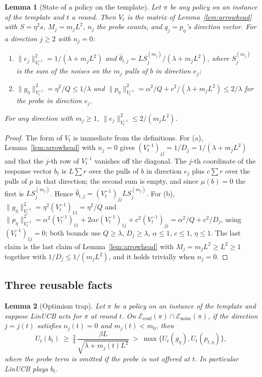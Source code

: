 \documentclass{article}
\newtheorem{lemma}{Lemma}
\theoremstyle{definition}
\theoremstyle{remark}
\theoremstyle{remark}
\begin{document}
\begin{lemma}[State of a policy on the template]
\label{lem:cat-state}
Let $\pi$ be any policy on an instance of the template and $t$ a round. Then
$V_t$ is the matrix of Lemma~\ref{lem:arrowhead} with $S=\eta^2s$, $M_j=m_jL^2$,
$n_j$ the probe counts, and $q_j=p_\eta$'s direction vector. For a direction
$j\ge2$ with $n_j=0$:
\begin{enumerate}[itemsep=1pt,topsep=1pt,leftmargin=*]
\item[(a)] $\|e_j\|^2_{V_t^{-1}}=1/(\lambda+m_jL^2)$ and
$\widehat\theta_{t,j}=LS_j^{(m_j)}/(\lambda+m_jL^2)$, where $S_j^{(m_j)}$ is the
sum of the noises on the $m_j$ pulls of $b$ in direction $e_j$;
\item[(b)] $\|g_\eta\|^2_{V_t^{-1}}=\eta^2/Q\le1/\lambda$ and
$\|p_\eta\|^2_{V_t^{-1}}=\alpha^2/Q+c^2/(\lambda+m_jL^2)\le2/\lambda$ for the probe
in direction $e_j$.
\end{enumerate}
For any direction with $m_j\ge1$, $\|e_j\|^2_{V_t^{-1}}\le2/(m_jL^2)$.
\end{lemma}

\begin{proof}
The form of $V_t$ is immediate from the definitions. For (a), Lemma~\ref{lem:arrowhead}
with $n_j=0$ gives $(V_t^{-1})_{jj}=1/D_j=1/(\lambda+m_jL^2)$ and that the $j$-th
row of $V_t^{-1}$ vanishes off the diagonal. The $j$-th coordinate of the
response vector $b_t$ is $L\sum r$ over the pulls of $b$ in direction $e_j$
plus $c\sum r$ over the pulls of $p$ in that direction; the second sum is
empty, and since $\mu(b)=0$ the first is $LS_j^{(m_j)}$. Hence
$\widehat\theta_{t,j}=(V_t^{-1})_{jj}LS_j^{(m_j)}$. For (b),
$\|g_\eta\|^2_{V_t^{-1}}=\eta^2(V_t^{-1})_{11}=\eta^2/Q$ and
$\|p_\eta\|^2_{V_t^{-1}}=\alpha^2(V_t^{-1})_{11}+2\alpha c(V_t^{-1})_{1j}+c^2(V_t^{-1})_{jj}
=\alpha^2/Q+c^2/D_j$, using $(V_t^{-1})_{1j}=0$; both bounds use $Q\ge\lambda$,
$D_j\ge\lambda$, $\alpha\le1$, $c\le1$, $\eta\le1$. The last claim is the last
claim of Lemma~\ref{lem:arrowhead} with $M_j=m_jL^2\ge L^2\ge1$ together with
$1/D_j\le1/(m_jL^2)$, and it holds trivially when $n_j=0$.
\end{proof}

\subsection{Three reusable facts}

\begin{lemma}[Optimism trap]
\label{lem:cat-trap}
Let $\pi$ be a policy on an instance of the template and suppose LinUCB acts
for $\pi$ at round $t$. On $\mathcal E_{\mathrm{conf}}(\pi)\cap\mathcal E_{\mathrm{noise}}(\pi)$,
if the direction $j=j(t)$ satisfies $n_j(t)=0$ and $m_j(t)<m_0$, then
\[
U_t(b_t)\ \ge\ \tfrac34\,\frac{\beta L}{\sqrt{\lambda+m_j(t)L^2}}\ >\ \max\{U_t(g_\eta),U_t(p_{t,\eta})\},
\]
where the probe term is omitted if the probe is not offered at $t$. In
particular LinUCB plays $b_t$.
\end{lemma}
\end{document}
